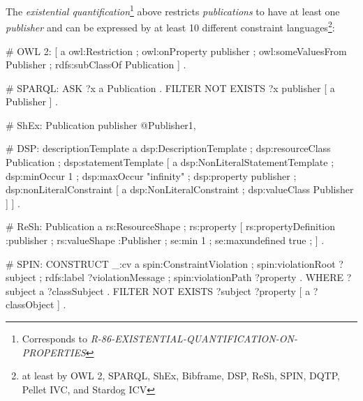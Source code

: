 \documentclass{llncs}
\newcommand{\ms}[1]{\texttt{#1}}
\newenvironment{DL}{
  \vspace{0cm}
	\begin{center}
  \begin{tabular}{r l}

}{
  \end{tabular}
	\end{center}
}
\begin{document}
{The {\em existential quantification}\footnote{Corresponds to {\em R-86-EXISTENTIAL-QUANTIFICATION-ON-PROPERTIES}}
above restricts \emph{publications} to have at least one \emph{publisher} and can be expressed by at least 10 different constraint languages\footnote{at least by OWL 2, SPARQL, ShEx, Bibframe, DSP, ReSh, SPIN, DQTP, Pellet IVC, and Stardog ICV}:

\begin{ex}
# OWL 2:
[ a owl:Restriction ;
  owl:onProperty publisher ;
  owl:someValuesFrom Publisher ;
  rdfs:subClassOf Publication ] .
	
# SPARQL:
ASK { ?x a Publication . FILTER NOT EXISTS { ?x publisher [ a Publisher ] } . }
	
# ShEx:
Publication {
    publisher @Publisher{1,} }
		
# DSP:
descriptionTemplate a dsp:DescriptionTemplate ;
    dsp:resourceClass Publication ; 
    dsp:statementTemplate [ a dsp:NonLiteralStatementTemplate ;
        dsp:minOccur 1 ; dsp:maxOccur "infinity" ; 
        dsp:property publisher ; 
        dsp:nonLiteralConstraint [ a dsp:NonLiteralConstraint ;
            dsp:valueClass Publisher ] ] .
		
# ReSh:
Publication a rs:ResourceShape ; rs:property [
    rs:propertyDefinition :publisher ;
    rs:valueShape :Publisher ;
    se:min 1 ; se:maxundefined true ; ] .
		
# SPIN:
CONSTRUCT {
    _:cv a spin:ConstraintViolation ; spin:violationRoot ?subject ;
         rdfs:label ?violationMessage ; spin:violationPath ?property . } WHERE 
{ ?subject a ?classSubject . FILTER NOT EXISTS { ?subject ?property [ a ?classObject ] } . }
\end{ex}



}
\end{document}
